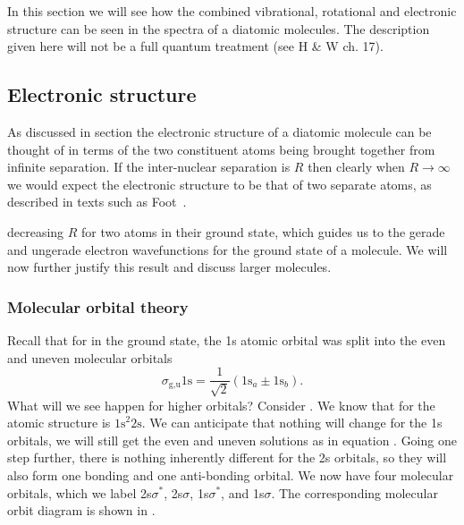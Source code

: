 In this section we will see how the combined vibrational, rotational and
electronic structure can be seen in the spectra of a diatomic molecules. The
description given here will not be a full quantum treatment (see H \& W ch. 17).

\subsection{Electronic structure}


As discussed in section  the electronic structure of a
diatomic molecule can be thought of in terms of the two constituent atoms being
brought together from infinite separation. If the inter-nuclear separation is
$R$ then clearly when $R \to \infty$ we would expect the electronic structure to
be that of two separate atoms, as described in texts such as
Foot~\cite{Foot2005}.

 decreasing $R$ for two  atoms in their
ground state, which guides us to the gerade and ungerade electron wavefunctions
for the ground state of a  molecule. We will now further justify this
result and discuss larger molecules.

\subsubsection{Molecular orbital theory}


Recall that for  in the ground state, the 1s atomic orbital was split into the
even and uneven molecular orbitals
%
\begin{equation}
  \sigma_\text{g,u} 1\mathrm{s} = \frac{1}{\sqrt{2}} ( 1\mathrm{s}_a \pm
  1\mathrm{s}_b ).
\end{equation}
%
What will we see happen for higher orbitals? Consider . We know that
for  the atomic structure is $\text{1s}^2\text{2s}$. We can anticipate
that nothing will change for the 1s orbitals, we will still get the even and
uneven solutions as in equation . Going one step further, there is
nothing inherently different for the 2s orbitals, so they will also form one
bonding and one anti-bonding orbital. We now have four molecular orbitals, which
we label 2s$\sigma^*$, 2s$\sigma$, 1s$\sigma^*$, and 1s$\sigma$.  The
corresponding molecular orbit diagram is shown in .

